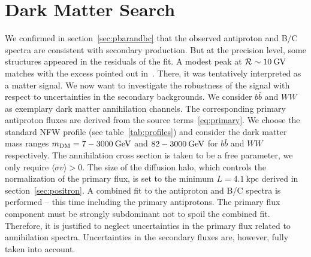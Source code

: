 \documentclass[a4paper,11pt]{article}
\newcommand{\eVdist}{\kern-0.06em}
\newcommand{\gev}{\:\text{Ge\eVdist V}}
\newcommand{\gv}{\:\text{G\eVdist V}}
\newcommand{\kpc}{\:\text{kpc}}
\newcommand{\R}{\mathcal{R}}
\begin{document}
\section{Dark Matter Search}\label{sec:darkmatter}

We confirmed in section~\ref{sec:pbarandbc} that the observed antiproton and B/C spectra are consistent with secondary production. But at the precision level, some structures appeared in the residuals of the fit. A modest peak at $\R\sim 10\gv$ matches with the excess pointed out in~\cite{Cuoco:2016eej,Cui:2016ppb}. There, it was tentatively interpreted as a matter signal. We now want to investigate the robustness of the signal with respect to uncertainties in the secondary backgrounds. 
We consider $b\bar{b}$ and $WW$ as exemplary dark matter annihilation channels. The corresponding primary antiproton fluxes are derived from the source terms~\eqref{eq:primary}. We choose the standard NFW profile (see table~\ref{tab:profiles}) and consider the dark matter mass ranges $m_{\text{DM}}=7-3000\gev$ and $82-3000\gev$ for $b\bar{b}$ and $WW$ respectively. The annihilation cross section is taken to be a free parameter, we only require $\langle \sigma 
v\rangle>0$. The size of the diffusion halo, which controls the normalization of the primary flux, is set to the minimum $L=4.1\kpc$ derived in section~\ref{sec:positron}. A combined fit to the antiproton and B/C spectra is performed -- this time including the primary antiprotons. The primary flux component must be strongly subdominant not to spoil the combined fit. Therefore, it is justified to neglect uncertainties in the primary flux related to annihilation spectra. Uncertainties in the secondary fluxes are, however, fully taken into account.
\end{document}
